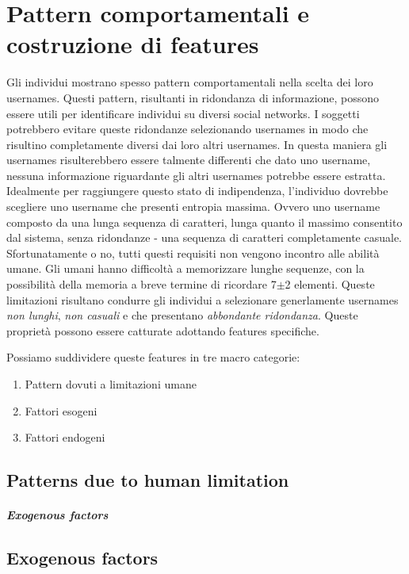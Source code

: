 \chapter{Pattern comportamentali e costruzione di features}
\label{cap2}
Gli individui mostrano spesso pattern comportamentali nella scelta dei loro usernames. Questi pattern, risultanti in ridondanza di informazione, possono essere utili per identificare individui su diversi social networks.
I soggetti potrebbero evitare queste ridondanze selezionando usernames in modo che risultino completamente diversi dai loro altri usernames. In questa maniera gli usernames risulterebbero essere talmente differenti che dato uno username, nessuna informazione riguardante gli altri usernames potrebbe essere estratta.
Idealmente per raggiungere questo stato di indipendenza, l'individuo dovrebbe scegliere uno username che presenti entropia massima. Ovvero uno username composto da una lunga sequenza di caratteri, lunga quanto il massimo consentito dal sistema, senza ridondanze - una sequenza di caratteri completamente casuale.
Sfortunatamente o no, tutti questi requisiti non vengono incontro alle abilità umane. Gli umani hanno difficoltà a memorizzare lunghe sequenze, con la possibilità della memoria a breve termine di ricordare 7$\pm$2 elementi. Queste limitazioni risultano condurre gli individui a selezionare generlamente usernames \textit{non lunghi}, \textit{non casuali} e che presentano \textit{abbondante ridondanza}.
Queste proprietà possono essere catturate adottando features specifiche.

Possiamo suddividere queste features in tre macro categorie:
\begin{enumerate}
  \item Pattern dovuti a limitazioni umane
  \item Fattori esogeni
  \item Fattori endogeni
\end{enumerate}


\section{Patterns due to human limitation}
\paragraph{Exogenous factors}
\section{Exogenous factors}
